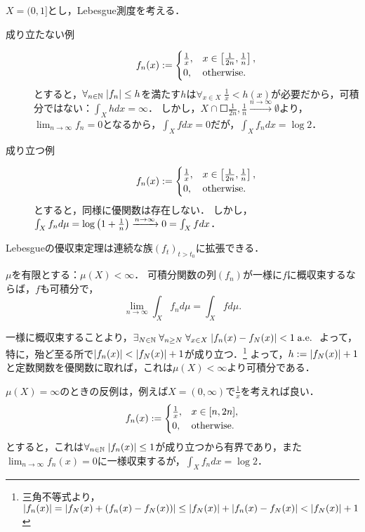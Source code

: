 \documentclass[uplatex, dvipdfmx]{jsreport}
\begin{document}
\begin{remark}[優関数が取れない場合は定理が成立することもしないこともある]
    $X=(0,1]$とし，Lebesgue測度を考える．
    \begin{description}
        \item[成り立たない例] \[f_n(x):=\begin{cases}
            \frac{1}{x},&x\in\left[\frac{1}{2n},\frac{1}{n}\right],\\
            0,&\mathrm{otherwise}.
        \end{cases}\]とすると，$\forall_{n\in\mathbb{N}}\;\lvert f_n\rvert\le h$を満たす$h$は$\forall_{x\in X}\;\frac{1}{x}<h(x)$が必要だから，可積分ではない：$\int_Xhdx=\infty$．
        しかし，$X\cap\Square{\frac{1}{2n},\frac{1}{n}}\xrightarrow{n\to\infty}\emptyset$より，$\lim_{n\to\infty}f_n=0$となるから，$\int_Xfdx=0$だが，$\int_Xf_ndx=\log 2$．
        \item[成り立つ例]
        \[f_n(x):=\begin{cases}
            \frac{1}{x},&x\in\left[\frac{1}{2n},\frac{1}{n}\right],\\
            0,&\mathrm{otherwise}.
        \end{cases}\]とすると，同様に優関数は存在しない．
        しかし，$\int_Xf_nd\mu=\log\left(1+\frac{1}{n}\right)\xrightarrow{n\to\infty}0=\int_Xfdx$．
    \end{description}
\end{remark}
\begin{remark}[微分と積分との交換に向けて]
    Lebesgueの優収束定理は連続な族$(f_t)_{t>t_0}$に拡張できる．
\end{remark}

\begin{corollary}[一様収束する可積分関数列の積分は収束する]
    $\mu$を有限とする：$\mu(X)<\infty$．
    可積分関数の列$(f_n)$が一様に$f$に概収束するならば，$f$も可積分で，
    \[\lim_{n\to\infty}\int_Xf_nd\mu=\int_Xfd\mu.\]
\end{corollary}
\begin{Proof}
    一様に概収束することより，$\exists_{N\in\mathbb{N}}\;\forall_{n\ge N}\;\forall_{x\in X}\;\lvert f_n(x)-f_N(x)\rvert<1\;\mathrm{a.e.}\;$
    よって，特に，殆ど至る所で$\lvert f_n(x)\rvert<\lvert f_N(x)\rvert+1$が成り立つ．\footnote{三角不等式より，$\lvert f_n(x)\rvert=\lvert f_N(x)+(f_n(x)-f_N(x))\rvert\le\lvert f_N(x)\rvert+\lvert f_n(x)-f_N(x)\rvert<\lvert f_N(x)\rvert+1$}
    よって，$h:=\lvert f_N(x)\rvert+1$と定数関数を優関数に取れば，これは$\mu(X)<\infty$より可積分である．
\end{Proof}

\begin{remark}[測度が有限でない場合の反例]
    $\mu(X)=\infty$のときの反例は，例えば$X=(0,\infty)$で$\frac{1}{x}$を考えれば良い．
    \[f_n(x):=\begin{cases}
        \frac{1}{x},&x\in[n,2n],\\
        0,&\mathrm{otherwise}.
    \end{cases}\]とすると，これは$\forall_{n\in\mathbb{N}}\;\lvert f_n(x)\rvert\le 1$が成り立つから有界であり，また$\lim_{n\to\infty}f_n(x)=0$に一様収束するが，$\int_Xf_ndx=\log 2$．
\end{remark}
\end{document}
